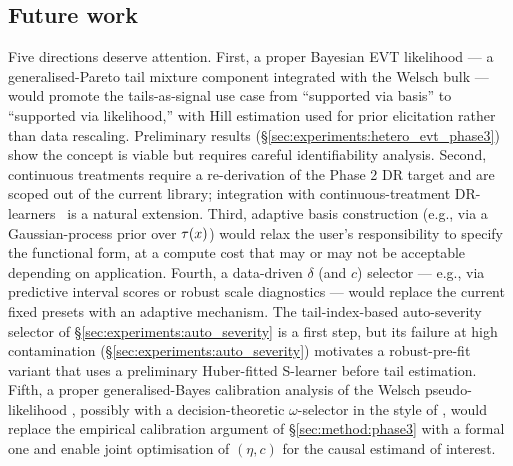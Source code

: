 \subsection{Future work}
\label{sec:discussion:future}
Five directions deserve attention. First, a proper Bayesian EVT
likelihood --- a generalised-Pareto tail mixture component
integrated with the Welsch bulk --- would promote the
tails-as-signal use case from ``supported via basis'' to
``supported via likelihood,'' with Hill estimation used for prior
elicitation rather than data rescaling. Preliminary results
(\S\ref{sec:experiments:hetero_evt_phase3}) show the concept
is viable but requires careful identifiability analysis. Second,
continuous treatments require a re-derivation of the Phase 2 DR
target and are scoped out of the current library; integration with
continuous-treatment DR-learners~\citep{kennedy2020optimal} is a
natural extension. Third, adaptive basis construction (e.g., via a
Gaussian-process prior over $\tau(x)$) would relax the user's
responsibility to specify the functional form, at a compute cost
that may or may not be acceptable depending on application.
Fourth, a data-driven $\delta$ (and $c$) selector --- e.g., via
predictive interval scores or robust scale diagnostics --- would
replace the current fixed presets with an adaptive mechanism.
The tail-index-based auto-severity selector of
\S\ref{sec:experiments:auto_severity} is a first step, but
its failure at high contamination (\S\ref{sec:experiments:auto_severity})
motivates a robust-pre-fit variant that uses a preliminary
Huber-fitted S-learner before tail estimation.
Fifth, a proper generalised-Bayes
calibration analysis of the Welsch pseudo-likelihood
\citep{bissiri2016general,lyddon2019general}, possibly with a
decision-theoretic $\omega$-selector in the style of
\citet{alexopoulos2025rbci}, would replace the empirical
calibration argument of \S\ref{sec:method:phase3} with a
formal one and enable joint optimisation of $(\eta, c)$ for
the causal estimand of interest.
